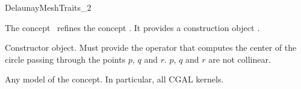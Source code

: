 \begin{ccRefConcept}{DelaunayMeshTraits_2}

\ccDefinition

The concept \ccRefName\ refines the concept
. It provides a construction
object .

\ccRefines


\ccTypes

 {Constructor object. Must provide
  the operator 
  that computes the center of the circle passing through the points $p$,
  $q$ and $r$.
  \ccPrecond $p$, $q$ and $r$ are not collinear.}




\ccHasModels
Any model of the  concept. In particular, all CGAL kernels.

\end{ccRefConcept}

